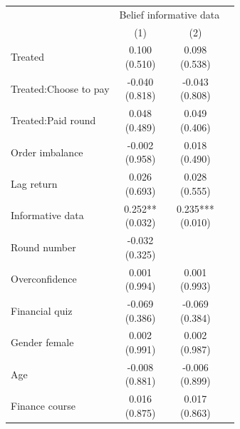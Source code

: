 \renewcommand\cellalign{t}
\begin{threeparttable}
\begin{tabular}{lccc}
\toprule
 & \multicolumn{2}{c}{Belief informative data} \\
\cmidrule(lr){2-3} 
 & (1) & (2) \\
\midrule
\addlinespace
Treated & \makecell{0.100 \\ (0.510) } & \makecell{0.098 \\ (0.538) } \\
Treated:Choose to pay & \makecell{-0.040 \\ (0.818) } & \makecell{-0.043 \\ (0.808) } \\
Treated:Paid round & \makecell{0.048 \\ (0.489) } & \makecell{0.049 \\ (0.406) } \\
Order imbalance & \makecell{-0.002 \\ (0.958) } & \makecell{0.018 \\ (0.490) } \\
Lag return & \makecell{0.026 \\ (0.693) } & \makecell{0.028 \\ (0.555) } \\
Informative data & \makecell{0.252** \\ (0.032) } & \makecell{0.235*** \\ (0.010) } \\
Round number & \makecell{-0.032 \\ (0.325) } &  \\
Overconfidence & \makecell{0.001 \\ (0.994) } & \makecell{0.001 \\ (0.993) } \\
Financial quiz & \makecell{-0.069 \\ (0.386) } & \makecell{-0.069 \\ (0.384) } \\
Gender female & \makecell{0.002 \\ (0.991) } & \makecell{0.002 \\ (0.987) } \\
Age & \makecell{-0.008 \\ (0.881) } & \makecell{-0.006 \\ (0.899) } \\
Finance course & \makecell{0.016 \\ (0.875) } & \makecell{0.017 \\ (0.863) } \\

\end{tabular}
\end{threeparttable}
